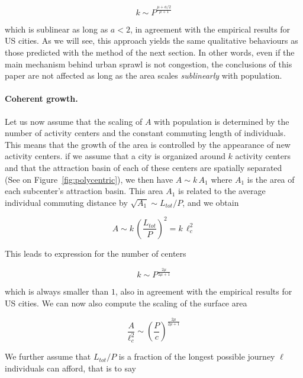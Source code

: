 \begin{equation}
    k \sim P^{\frac{\mu + a/2}{\mu+1}}
\end{equation}

which is sublinear as long as $a<2$, in agreement with the empirical results for
US cities. As we will see, this approach yields the same qualitative behaviours
as those predicted with the method of the next section. In other words, even if
the main mechanism behind urban sprawl is not congestion, the conclusions of
this paper are not affected as long as the area scales \emph{sublinearly} with
population.\\


\paragraph{Coherent growth.}

Let us now assume that the scaling of $A$ with population is determined by the
number of activity centers and the constant commuting length of individuals.
This means that the growth of the area is controlled by the appearance of new
activity centers. if we assume that a city is organized around $k$ activity
centers and that the attraction basin of each of these centers are spatially
separated~\cite{Louf:2013_polycentric} (See on Figure~\ref{fig:polycentric}), we then have  $A \sim k\, A_1$ where $A_1$ is the
area of each subcenter's attraction basin. This area $A_1$ is related to the
average individual commuting distance by $\sqrt{A_1} \sim L_{tot} / P$, and we
obtain

\begin{equation}
    A \sim k\,  \left( \frac{L_{tot}}{P} \right)^2 = k\, \ell_c^2
    \label{eq:area_poly}
\end{equation}

This leads to expression for the number of centers

\begin{equation}
    k \sim P^{\frac{2 \mu}{2\mu+1}}
\end{equation}

which is always smaller than $1$, also in agreement with the empirical results
for US cities. We can now also compute the scaling of the surface area

\begin{equation}
    \frac{A}{\ell_c^2} \sim \left( \frac{P}{c} \right)^{\frac{2 \mu}{2\mu+1}}
\end{equation}

We further assume that $L_{tot} / P$ is a fraction of the longest possible
journey $\ell$ individuals can afford, that is to say 

